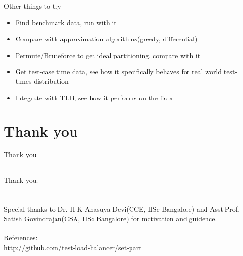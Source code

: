 \documentclass{beamer}
\begin{document}
\begin{frame}{Other things to try}
  \begin{centering}
    \begin{itemize}
    \item Find benchmark data, run with it
      \pause
    \item Compare with approximation algorithms(greedy, differential)
      \pause
    \item Permute/Bruteforce to get ideal partitioning, compare with it
      \pause
    \item Get test-case time data, see how it specifically behaves for real world test-times distribution
      \pause
    \item Integrate with TLB, see how it performs on the floor
    \end{itemize}
  \end{centering}
\end{frame}

\section*{Thank you}

\begin{frame}{Thank you}
  \begin{centering}
    \quad\\
        {\huge Thank you.}\\
        \quad\\
        \quad\\
        Special thanks to Dr. H K Anasuya Devi(CCE, IISc Bangalore) and Asst.Prof. Satish Govindrajan(CSA, IISc Bangalore) for motivation and guidence.
        \quad\\
        \quad\\
        References:\\
        http://github.com/test-load-balancer/set-part\\
  \end{centering}
\end{frame}

\end{document}
